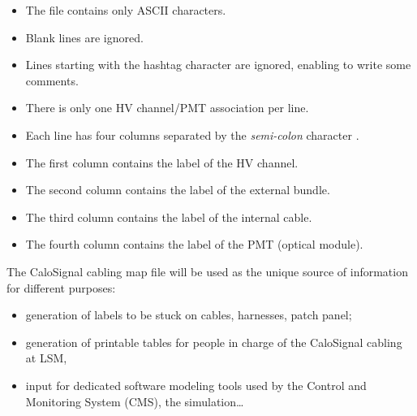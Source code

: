 \begin{itemize}
\item The file contains only ASCII characters.
\item Blank lines are ignored.
\item Lines starting with the hashtag character \fbox{\texttt{\#}} are
  ignored, enabling to write some comments.
\item There is only one HV channel/PMT association per line.
\item Each  line has  four columns  separated by  the \emph{semi-colon}
  character \fbox{\texttt{;}}.
\item The first column contains the label of the HV channel.
\item The second column contains the label of the external bundle.
\item The third column contains the label of the internal cable.
\item The fourth column contains the label of the PMT (optical module).
\end{itemize}

\par\noindent The  CaloSignal cabling  map file  will be  used as  the unique
source of information for different purposes:
\begin{itemize}
\item generation of labels to be stuck on cables, harnesses, patch panel;
\item generation of  printable tables for people in charge  of the CaloSignal
  cabling at LSM,
\item input for dedicated software  modeling tools used by the
  Control and Monitoring System (CMS), the simulation\dots 
\end{itemize}









